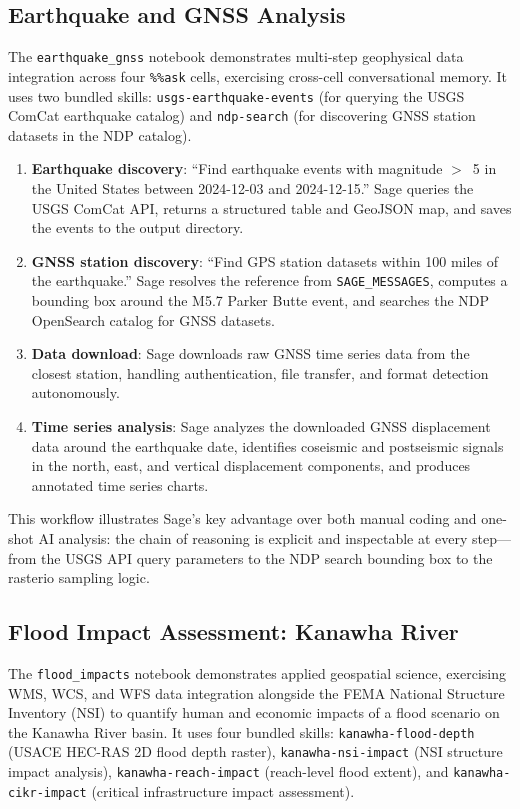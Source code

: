 \documentclass[10pt,twocolumn]{article}
\begin{document}
\subsection{Earthquake and GNSS Analysis}

The \texttt{earthquake\_gnss} notebook demonstrates multi-step geophysical data integration across four \texttt{\%\%ask} cells, exercising cross-cell conversational memory. It uses two bundled skills: \texttt{usgs-earthquake-events} (for querying the USGS ComCat earthquake catalog) and \texttt{ndp-search} (for discovering GNSS station datasets in the NDP catalog).

\begin{enumerate}
  \item \textbf{Earthquake discovery}: ``Find earthquake events with magnitude $>$~5 in the United States between 2024-12-03 and 2024-12-15.'' Sage queries the USGS ComCat API, returns a structured table and GeoJSON map, and saves the events to the output directory.
  \item \textbf{GNSS station discovery}: ``Find GPS station datasets within 100 miles of the earthquake.'' Sage resolves the reference from \texttt{SAGE\_MESSAGES}, computes a bounding box around the M5.7 Parker Butte event, and searches the NDP OpenSearch catalog for GNSS datasets.
  \item \textbf{Data download}: Sage downloads raw GNSS time series data from the closest station, handling authentication, file transfer, and format detection autonomously.
  \item \textbf{Time series analysis}: Sage analyzes the downloaded GNSS displacement data around the earthquake date, identifies coseismic and postseismic signals in the north, east, and vertical displacement components, and produces annotated time series charts.
\end{enumerate}

This workflow illustrates Sage's key advantage over both manual coding and one-shot AI analysis: the chain of reasoning is explicit and inspectable at every step---from the USGS API query parameters to the NDP search bounding box to the rasterio sampling logic.

\subsection{Flood Impact Assessment: Kanawha River}

The \texttt{flood\_impacts} notebook demonstrates applied geospatial science, exercising WMS, WCS, and WFS data integration alongside the FEMA National Structure Inventory (NSI) to quantify human and economic impacts of a flood scenario on the Kanawha River basin. It uses four bundled skills: \texttt{kanawha-flood-depth} (USACE HEC-RAS 2D flood depth raster), \texttt{kanawha-nsi-impact} (NSI structure impact analysis), \texttt{kanawha-reach-impact} (reach-level flood extent), and \texttt{kanawha-cikr-impact} (critical infrastructure impact assessment).
\end{document}
